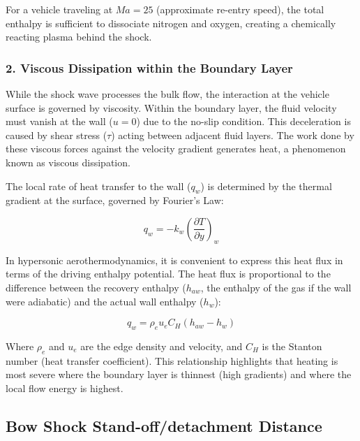 For a vehicle traveling at $Ma = 25$ (approximate re-entry speed), the total enthalpy is sufficient to dissociate nitrogen and oxygen, creating a chemically reacting plasma behind the shock.

\subsubsection*{2. Viscous Dissipation within the Boundary Layer}
While the shock wave processes the bulk flow, the interaction at the vehicle surface is governed by viscosity. Within the boundary layer, the fluid velocity must vanish at the wall ($u=0$) due to the no-slip condition. This deceleration is caused by shear stress ($\tau$) acting between adjacent fluid layers. The work done by these viscous forces against the velocity gradient generates heat, a phenomenon known as viscous dissipation.
\par
The local rate of heat transfer to the wall ($q_w$) is determined by the thermal gradient at the surface, governed by Fourier’s Law:

\begin{equation}
    q_w = -k_w \left( \frac{\partial T}{\partial y} \right)_{w}
\end{equation}

In hypersonic aerothermodynamics, it is convenient to express this heat flux in terms of the driving enthalpy potential. The heat flux is proportional to the difference between the recovery enthalpy ($h_{aw}$, the enthalpy of the gas if the wall were adiabatic) and the actual wall enthalpy ($h_w$):

\begin{equation}
    q_w = \rho_e u_e C_H (h_{aw} - h_w)
\end{equation}

Where $\rho_e$ and $u_e$ are the edge density and velocity, and $C_H$ is the Stanton number (heat transfer coefficient). This relationship highlights that heating is most severe where the boundary layer is thinnest (high gradients) and where the local flow energy is highest.


\subsection{Bow Shock Stand-off/detachment Distance}

